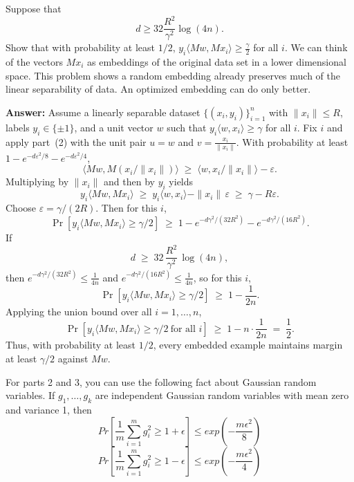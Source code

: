 \documentclass[a4paper]{article}
\begin{document}
\begin{enumerate}
        Suppose that $$d \geq 32 \frac{R^2}{\gamma^2}\log(4n).$$
        Show that with probability at least $1/2$, $y_i \langle M w, M x_i  \rangle  \geq \frac{\gamma}{2}$ for all $i$.
        We can think of the vectors $M x_i$ as embeddings of the original data set in a lower dimensional space.
        This problem shows a random embedding already preserves much of the linear separability of data.
        An optimized embedding can do only better.

\textbf{Answer:}
Assume a linearly separable dataset $\{(x_i,y_i)\}_{i=1}^n$ with $\|x_i\|\le R$, labels $y_i\in\{\pm1\}$,
and a unit vector $w$ such that $y_i\langle w,x_i\rangle\ge \gamma$ for all $i$.
Fix $i$ and apply part~(2) with the unit pair $u=w$ and $v=\frac{x_i}{\|x_i\|}$.
With probability at least $1-e^{-d\varepsilon^2/8}-e^{-d\varepsilon^2/4}$,
\[
\langle Mw,M(x_i/\|x_i\|)\rangle \;\ge\; \langle w,x_i/\|x_i\|\rangle - \varepsilon.
\]
Multiplying by $\|x_i\|$ and then by $y_i$ yields
\[
y_i\langle Mw,Mx_i\rangle
\;\ge\; y_i\langle w,x_i\rangle - \|x_i\|\,\varepsilon
\;\ge\; \gamma - R\varepsilon.
\]
Choose $\varepsilon=\gamma/(2R)$. Then for this $i$,
\[
\Pr\!\left[y_i\langle Mw,Mx_i\rangle \ge \gamma/2\right]
\;\ge\; 1-e^{-d\gamma^2/(32R^2)}-e^{-d\gamma^2/(16R^2)}.
\]
If
\[
d \;\ge\; 32\,\frac{R^2}{\gamma^2}\,\log(4n),
\]
then $e^{-d\gamma^2/(32R^2)}\le \frac{1}{4n}$ and $e^{-d\gamma^2/(16R^2)}\le \frac{1}{4n}$, so for this $i$,
\[
\Pr\!\left[y_i\langle Mw,Mx_i\rangle \ge \gamma/2\right]\;\ge\; 1-\frac{1}{2n}.
\]
Applying the union bound over all $i=1,\dots,n$,
\[
\Pr\!\left[y_i\langle Mw,Mx_i\rangle \ge \gamma/2 \ \text{for all } i\right]
\;\ge\; 1 - n\cdot\frac{1}{2n}
\;=\; \frac12.
\]
Thus, with probability at least $1/2$, every embedded example maintains margin at least $\gamma/2$ against $Mw$.

\end{enumerate}
    For parts 2 and 3, you can use the following fact about Gaussian random variables.
        If $g_1 , \dots, g_k$ are independent Gaussian random variables with mean zero and variance 1, then
        $$Pr\left[\frac{1}{m}\sum_{i=1}^m g_i^2 \geq 1 + \epsilon\right] \leq exp\left( -\frac{m\epsilon^2}{8}\right)$$
        $$Pr\left[\frac{1}{m}\sum_{i=1}^m g_i^2 \geq 1 - \epsilon\right] \leq exp\left( -\frac{m\epsilon^2}{4}\right)$$
\end{document}
